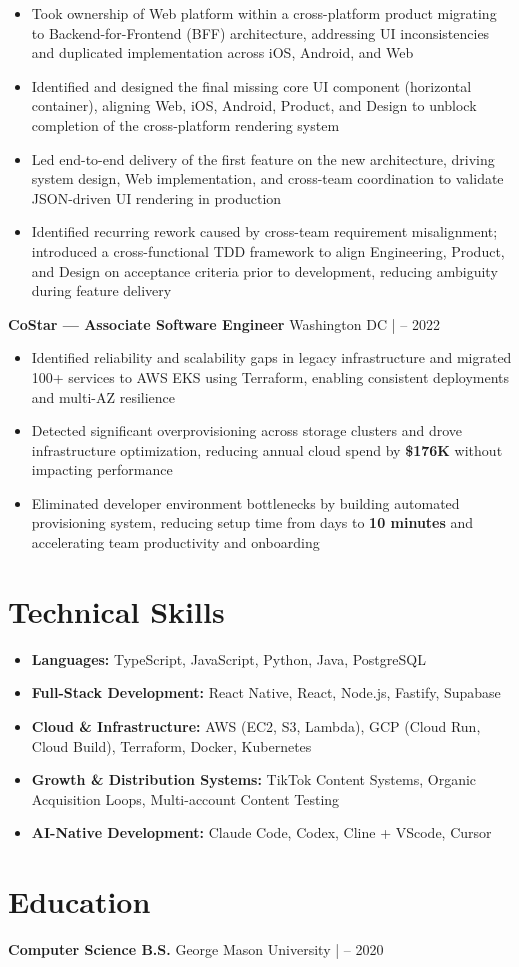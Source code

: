 \documentclass[letterpaper,11pt]{article}
\begin{document}
\begin{itemize}[leftmargin=*]
\item Took ownership of Web platform within a cross-platform product migrating to Backend-for-Frontend (BFF) architecture, addressing UI inconsistencies and duplicated implementation across iOS, Android, and Web
\item Identified and designed the final missing core UI component (horizontal container), aligning Web, iOS, Android, Product, and Design to unblock completion of the cross-platform rendering system
\item Led end-to-end delivery of the first feature on the new architecture, driving system design, Web implementation, and cross-team coordination to validate JSON-driven UI rendering in production
\item Identified recurring rework caused by cross-team requirement misalignment; introduced a cross-functional TDD framework to align Engineering, Product, and Design on acceptance criteria prior to development, reducing ambiguity during feature delivery
\end{itemize}

\vspace{2pt}

\noindent\textbf{CoStar — Associate Software Engineer} \hfill Washington DC \quad |  – 2022

\begin{itemize}[leftmargin=*]
\item Identified reliability and scalability gaps in legacy infrastructure and migrated 100+ services to AWS EKS using Terraform, enabling consistent deployments and multi-AZ resilience
\item Detected significant overprovisioning across storage clusters and drove infrastructure optimization, reducing annual cloud spend by \textbf{\$176K} without impacting performance
\item Eliminated developer environment bottlenecks by building automated provisioning system, reducing setup time from days to \textbf{10 minutes} and accelerating team productivity and onboarding
\end{itemize}

\section*{Technical Skills}
\begin{itemize}[leftmargin=*]
\item \textbf{Languages:} TypeScript, JavaScript, Python, Java, PostgreSQL
\item \textbf{Full-Stack Development:} React Native, React, Node.js, Fastify, Supabase
\item \textbf{Cloud \& Infrastructure:} AWS (EC2, S3, Lambda), GCP (Cloud Run, Cloud Build), Terraform, Docker, Kubernetes
\item \textbf{Growth \& Distribution Systems:} TikTok Content Systems, Organic Acquisition Loops, Multi-account Content Testing
\item \textbf{AI-Native Development:} Claude Code, Codex, Cline + VScode, Cursor 
\end{itemize}

\section*{Education}
\textbf{Computer Science B.S.} \hfill George Mason University \quad |  – 2020 
\end{document}
